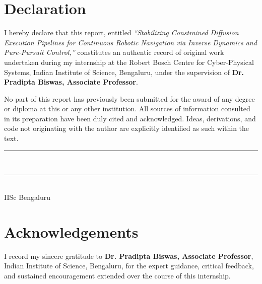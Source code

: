 \documentclass[12pt, a4paper, oneside]{report}
\theoremstyle{definition}
\begin{document}
\chapter*{Declaration}
{}

I hereby declare that this report, entitled \textit{``Stabilizing
Constrained Diffusion Execution Pipelines for Continuous Robotic
Navigation via Inverse Dynamics and Pure-Pursuit Control,''}
constitutes an authentic record of original work undertaken during
my internship at the Robert Bosch Centre for Cyber-Physical Systems,
Indian Institute of Science, Bengaluru, under the supervision of
\textbf{Dr. Pradipta Biswas, Associate Professor}.

No part of this report has previously been submitted for the award
of any degree or diploma at this or any other institution. All
sources of information consulted in its preparation have been duly
cited and acknowledged. Ideas, derivations, and code not originating
with the author are explicitly identified as such within the text.

\vspace{2.5cm}
\noindent
\begin{minipage}[t]{0.45\linewidth}
  \rule{5cm}{0.4pt}\\[4pt]
\end{minipage}
\hfill
\begin{minipage}[t]{0.45\linewidth}
  \rule{5cm}{0.4pt}\\[4pt]
  IISc Bengaluru
\end{minipage}

\cleardoublepage

\chapter*{Acknowledgements}
{}

I record my sincere gratitude to \textbf{Dr. Pradipta Biswas, Associate Professor},
Indian Institute of Science, Bengaluru, for the
expert guidance, critical feedback, and sustained encouragement
extended over the course of this internship.
\end{document}
